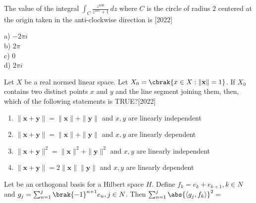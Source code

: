 \iffalse
\author{EE24BTECH11062}
\section{ma}
\chapter{2022}
\fi

\item The value of the integral $\int_C \frac{z^{100}}{z^{101}+1} \, dz$ where $C$ is the circle of radius 2 centered at the origin taken in the anti-clockwise direction is \hfill{[2022]}
\begin{multicols}{4}
    a) $-2\pi i$\\
    b) $2\pi$\\
    c) 0\\
    d)  $2\pi i$
\end{multicols}

 \item Let $X$ be a real normed linear space. Let $X_0=\cbrak{x\in X:\|\mathbf{x}\|=1}$. If $X_0$ contains two distinct points $x$ and $y$ and the line segment joining them, then, which of the following statements is TRUE?\hfill{[2022]}

 \begin{enumerate}
     \item $\|\mathbf{x+y}\|=\|\mathbf{x}\|+\|\mathbf{y}\|$ and $x,y$ are linearly independent\\
     \item $\|\mathbf{x+y}\|=\|\mathbf{x}\|+\|\mathbf{y}\|$ and $x,y$ are linearly dependent\\
     \item $\|\mathbf{x+y}\|^2=\|\mathbf{x}\|^2+\|\mathbf{y}\|^2$ and $x,y$ are linearly independent\\
     \item $\|\mathbf{x+y}\|=2\|\mathbf{x}\|\|\mathbf{y}\|$ and $x,y$ are linearly dependent
 \end{enumerate}
 
\item Let  be an orthogonal basis for a Hilbert space $H$. Define $f_k=e_k+e_{k+1},k\in N$ and $g_j=\sum_{n=1}^j \brak{-1}^{n+1}e_n,j\in N$. Then $\sum_{n=1}^j \abs{\langle g_j, f_k \rangle
}^2=$


